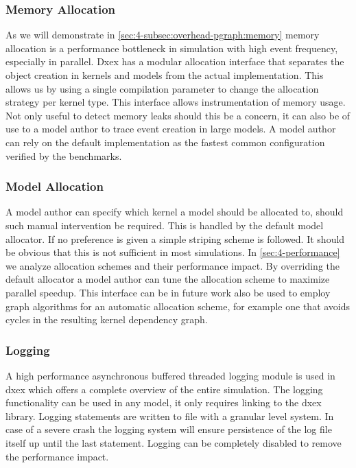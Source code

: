 \subsubsection{Memory Allocation}
As we will demonstrate in \ref{sec:4-subsec:overhead-pgraph:memory} memory allocation is a performance bottleneck in simulation with high event frequency, especially in parallel. Dxex has a modular allocation interface that separates the object creation in kernels and models from the actual implementation. This allows us by using a single compilation parameter to change the allocation strategy per kernel type. This interface allows instrumentation of memory usage. Not only useful to detect memory leaks should this be a concern, it can also be of use to a model author to trace event creation in large models. A model author can rely on the default implementation as the fastest common configuration verified by the benchmarks.
\subsubsection{Model Allocation}
A model author can specify which kernel a model should be allocated to, should such manual intervention be required. This is handled by the default model allocator. If no preference is given a simple striping scheme is followed. It should be obvious that this is not sufficient in most simulations. In \ref{sec:4-performance} we analyze allocation schemes and their performance impact. By overriding the default allocator a model author can tune the allocation scheme to maximize parallel speedup. This interface can be in future work also be used to employ graph algorithms for an automatic allocation scheme, for example one that avoids cycles in the resulting kernel dependency graph.
\subsubsection{Logging}
A high performance asynchronous buffered threaded logging module is used in dxex which offers a complete overview of the entire simulation. The logging functionality can be used in any model, it only requires linking to the dxex library. Logging statements are written to file with a granular level system. In case of a severe crash the logging system will ensure persistence of the log file itself up until the last statement. Logging can be completely disabled to remove the performance impact.
